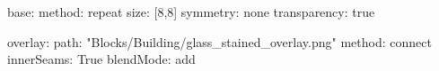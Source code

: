 base:
  method: repeat
  size: [8,8]
  symmetry: none
  transparency: true
  
overlay:
  path: "Blocks/Building/glass_stained_overlay.png"
  method: connect
  innerSeams: True
blendMode: add